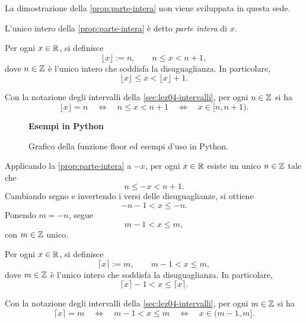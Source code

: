La dimostrazione della \cref{prop:parte-intera} non viene
sviluppata in questa sede.

\clearpage

L'unico intero della \cref{prop:parte-intera}
è detto \emph{parte intera} di \(x\).

\begin{definition}
\label{def:floor}
Per ogni \(x\in\mathbb{R}\), si definisce
\[
  \lfloor x\rfloor:=n,
  \qquad n\le x<n+1,
\]
dove \(n\in\mathbb{Z}\) è l'unico intero che soddisfa
la disuguaglianza. In particolare,
\[
  \lfloor x\rfloor\le x<\lfloor x\rfloor+1.
\]
\end{definition}

Con la notazione degli intervalli della \cref{sec:lez04-intervalli},
per ogni \(n\in\mathbb{Z}\) si ha
\[
  \lfloor x\rfloor=n
  \quad\Longleftrightarrow\quad
  n\le x<n+1
  \quad\Longleftrightarrow\quad
  x\in[n,n+1).
\]

\begin{figure}[htbp]
  \centering
  \begin{minipage}[c]{0.56\textwidth}
    \centering
    
  \end{minipage}
  \hfill
  \begin{minipage}[c]{0.38\textwidth}
    \small
    \textbf{Esempi in Python}
    
    \vspace{0.5em}
  \end{minipage}
  \caption{Grafico della funzione floor ed esempi d'uso in Python.}
  \label{fig:floor}
\end{figure}

Applicando la \cref{prop:parte-intera} a \(-x\),
per ogni \(x\in\mathbb{R}\) esiste un unico \(n\in\mathbb{Z}\) tale che
\[
  n\le-x<n+1.
\]
Cambiando segno e invertendo i versi delle disuguaglianze,
si ottiene
\[
  -n-1<x\le-n.
\]
Ponendo \(m=-n\), segue
\[
  m-1<x\le m,
\]
con \(m\in\mathbb{Z}\) unico.

\begin{definition}
\label{def:ceiling}
Per ogni \(x\in\mathbb{R}\), si definisce
\[
  \lceil x\rceil:=m,
  \qquad m-1<x\le m,
\]
dove \(m\in\mathbb{Z}\) è l'unico intero che soddisfa
la disuguaglianza. In particolare,
\[
  \lceil x\rceil-1<x\le\lceil x\rceil.
\]
\end{definition}

Con la notazione degli intervalli della \cref{sec:lez04-intervalli},
per ogni \(m\in\mathbb{Z}\) si ha
\[
  \lceil x\rceil=m
  \quad\Longleftrightarrow\quad
  m-1<x\le m
  \quad\Longleftrightarrow\quad
  x\in(m-1,m].
\]

